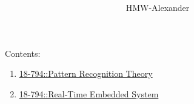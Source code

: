 \documentclass[letterpaper,11pt]{article}
\title{\textbf{}}
\author{HMW-Alexander}
\begin{document}
Contents:
\begin{enumerate}
	\item \href{./18794 Pattern Recognition Theory/Notes/document.html}{18-794::Pattern Recognition Theory}
	\item \href{./18648 Read-Time Embedded System/Notes/document.html}{18-794::Real-Time Embedded System}
\end{enumerate}	
	
\end{document}
